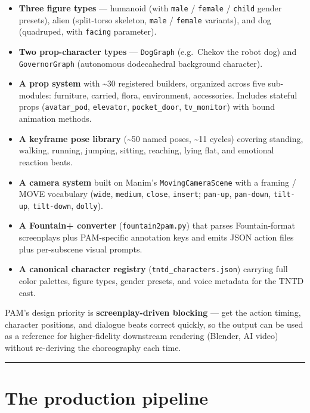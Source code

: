 \documentclass[
  12pt,
  letterpaper,
]{book}
\providecommand{\tightlist}{%
  \setlength{\itemsep}{0pt}\setlength{\parskip}{0pt}}
\begin{document}
\begin{itemize}
\tightlist
\item
  \textbf{Three figure types} --- humanoid (with \texttt{male} /
  \texttt{female} / \texttt{child} gender presets), alien (split-torso
  skeleton, \texttt{male} / \texttt{female} variants), and dog
  (quadruped, with \texttt{facing} parameter).
\item
  \textbf{Two prop-character types} --- \texttt{DogGraph} (e.g.~Chekov
  the robot dog) and \texttt{GovernorGraph} (autonomous dodecahedral
  background character).
\item
  \textbf{A prop system} with \textasciitilde30 registered builders,
  organized across five sub-modules: furniture, carried, flora,
  environment, accessories. Includes stateful props
  (\texttt{avatar\_pod}, \texttt{elevator}, \texttt{pocket\_door},
  \texttt{tv\_monitor}) with bound animation methods.
\item
  \textbf{A keyframe pose library} (\textasciitilde50 named poses,
  \textasciitilde11 cycles) covering standing, walking, running,
  jumping, sitting, reaching, lying flat, and emotional reaction beats.
\item
  \textbf{A camera system} built on Manim's \texttt{MovingCameraScene}
  with a framing / MOVE vocabulary (\texttt{wide}, \texttt{medium},
  \texttt{close}, \texttt{insert}; \texttt{pan-up}, \texttt{pan-down},
  \texttt{tilt-up}, \texttt{tilt-down}, \texttt{dolly}).
\item
  \textbf{A Fountain+ converter} (\texttt{fountain2pam.py}) that parses
  Fountain-format screenplays plus PAM-specific annotation keys and
  emits JSON action files plus per-subscene visual prompts.
\item
  \textbf{A canonical character registry}
  (\texttt{tntd\_characters.json}) carrying full color palettes, figure
  types, gender presets, and voice metadata for the TNTD cast.
\end{itemize}

PAM's design priority is \textbf{screenplay-driven blocking} --- get the
action timing, character positions, and dialogue beats correct quickly,
so the output can be used as a reference for higher-fidelity downstream
rendering (Blender, AI video) without re-deriving the choreography each
time.

\begin{center}\rule{0.5\linewidth}{0.5pt}\end{center}

\section{The production pipeline}\label{the-production-pipeline}
\end{document}
